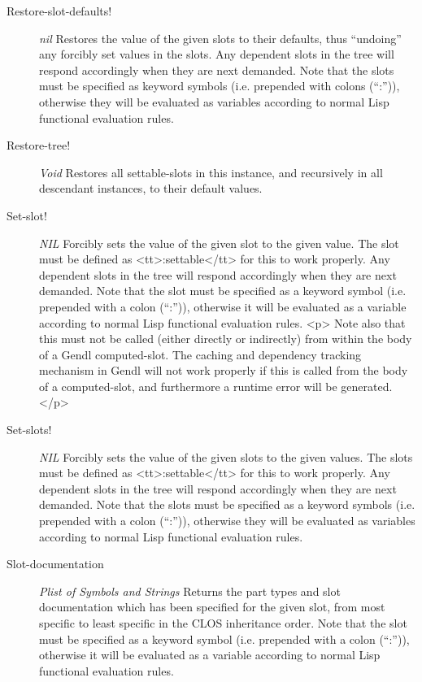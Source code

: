 \documentclass [11pt]{book}
\begin{document}
\begin{itemize}
\begin{description}
\item [Restore-slot-defaults!]
\emph{nil} Restores the value of the given slots to their defaults, thus ``undoing'' any forcibly set values
in the slots. Any dependent slots in the tree will respond accordingly when they are next demanded.
Note that the slots must be specified as keyword symbols (i.e. prepended with colons (``:'')),
otherwise they will be evaluated as variables according to normal Lisp functional evaluation rules.


\item [Restore-tree!]
\emph{Void} Restores all settable-slots in this instance, and recursively in all descendant instances,
to their default values.


\item [Set-slot!]
\emph{NIL} Forcibly sets the value of the given slot to the given value. The slot must be defined
as <tt>:settable</tt> for this to work properly. Any dependent slots in the tree will
respond accordingly when they are next demanded. Note that the slot must be specified as a keyword
symbol (i.e. prepended with a colon (``:'')), otherwise it will be evaluated as a variable according
to normal Lisp functional evaluation rules.
<p>
Note also that this must not be called (either directly or indirectly)
from within the body of a Gendl computed-slot. The caching and
dependency tracking mechanism in Gendl will not work properly if this
is called from the body of a computed-slot, and furthermore a runtime
error will be generated.
</p>


\item [Set-slots!]
\emph{NIL} Forcibly sets the value of the given slots to the given values. The slots must be defined
as <tt>:settable</tt> for this to work properly. Any dependent slots in the tree will
respond accordingly when they are next demanded. Note that the slots must be specified as a keyword
symbols (i.e. prepended with a colon (``:'')), otherwise they will be evaluated as variables according
to normal Lisp functional evaluation rules.


\item [Slot-documentation]
\emph{Plist of Symbols and Strings} Returns the part types and slot documentation which has been
specified for the given slot, from most specific to least specific in the CLOS inheritance order.
Note that the slot must be specified as a keyword symbol (i.e. prepended with a colon (``:'')),
otherwise it will be evaluated as a variable according to normal Lisp functional evaluation rules.



\end{description}
\end{itemize}
\end{document}
